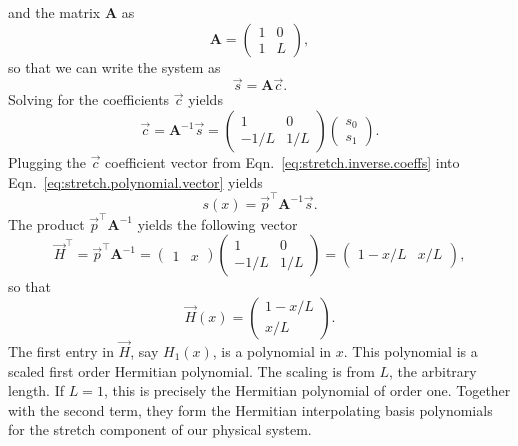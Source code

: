 and the matrix $\mathbf{A}$ as
\begin{equation}
\mathbf A = 
\begin{pmatrix}
1 & 0 \\
1 & L
\end{pmatrix},
\end{equation}
so that we can write the system as
\begin{equation}
\vec{s} = \mathbf{A}\vec{c}.
\end{equation}
Solving for the coefficients $\vec{c}$ yields
\begin{equation}
\vec{c} = \mathbf{A}^{-1}\vec{s} = 
\begin{pmatrix}
1 & 0 \\
-1/L & 1/L
\end{pmatrix}
\begin{pmatrix}
s_0 \\
s_1
\end{pmatrix}.
\label{eq:stretch.inverse.coeffs}
\end{equation}
Plugging the $\vec{c}$ coefficient vector from Eqn.~\ref{eq:stretch.inverse.coeffs} into Eqn.~\ref{eq:stretch.polynomial.vector} yields
\begin{equation}
s(x) = \vec{p}^\top\mathbf{A}^{-1}\vec{s}.
\end{equation}
The product $\vec{p}^\top\mathbf{A}^{-1}$ yields the following vector
\begin{equation}
\vec{H}^\top = \vec{p}^\top\mathbf{A}^{-1} = 
\begin{pmatrix}
1 & x
\end{pmatrix}
\begin{pmatrix}
1 & 0 \\
-1/L & 1/L
\end{pmatrix} = 
\begin{pmatrix}
1-x/L & x/L
\end{pmatrix},
\end{equation}
so that
\begin{equation}
\vec H(x) =
\begin{pmatrix}
1-x/L \\
x/L
\end{pmatrix}.
\end{equation}
The first entry in $\vec H$, say $H_1(x)$, is a polynomial in $x$. This polynomial is a scaled first order Hermitian polynomial. The scaling is from $L$, the arbitrary length. If $L=1$, this is precisely the Hermitian polynomial of order one. Together with the second term, they form the Hermitian interpolating basis polynomials for the stretch component of our physical system.

